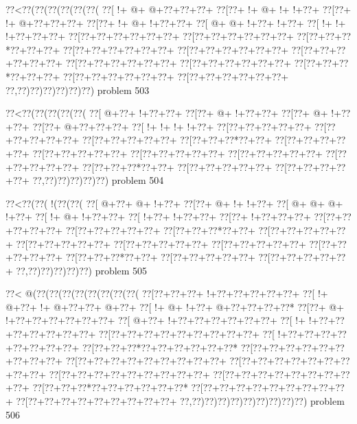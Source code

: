 \vbox{\vbox{\goo
\0??<\0??(\0??(\0??(\0??(\0??(\0??(
\0??[\- !+\- @+\- @+\0??+\0??+\0??+
\0??[\0??+\- !+\- @+\- !+\- !+\0??+
\0??[\0??+\- !+\- @+\0??+\0??+\0??+
\0??[\0??+\- !+\- @+\- !+\0??+\0??+
\0??[\- @+\- @+\- !+\0??+\- !+\0??+
\0??[\- !+\- !+\- !+\0??+\0??+\0??+
\0??[\0??+\0??+\0??+\0??+\0??+\0??+
\0??[\0??+\0??+\0??+\0??+\0??+\0??+
\0??[\0??+\0??+\0??*\0??+\0??+\0??+
\0??[\0??+\0??+\0??+\0??+\0??+\0??+
\0??[\0??+\0??+\0??+\0??+\0??+\0??+
\0??[\0??+\0??+\0??+\0??+\0??+\0??+
\0??[\0??+\0??+\0??+\0??+\0??+\0??+
\0??[\0??+\0??+\0??+\0??+\0??+\0??+
\0??[\0??+\0??+\0??*\0??+\0??+\0??+
\0??[\0??+\0??+\0??+\0??+\0??+\0??+
\0??[\0??+\0??+\0??+\0??+\0??+\0??+
\0??,\0??)\0??)\0??)\0??)\0??)\0??)
}
\hfil problem 503\hfil\break
}

\vbox{\vbox{\goo
\0??<\0??(\0??(\0??(\0??(\0??(
\0??[\- @+\0??+\- !+\0??+\0??+
\0??[\0??+\- @+\- !+\0??+\0??+
\0??[\0??+\- @+\- !+\0??+\0??+
\0??[\0??+\- @+\0??+\0??+\0??+
\0??[\- !+\- !+\- !+\- !+\0??+
\0??[\0??+\0??+\0??+\0??+\0??+
\0??[\0??+\0??+\0??+\0??+\0??+
\0??[\0??+\0??+\0??+\0??+\0??+
\0??[\0??+\0??+\0??*\0??+\0??+
\0??[\0??+\0??+\0??+\0??+\0??+
\0??[\0??+\0??+\0??+\0??+\0??+
\0??[\0??+\0??+\0??+\0??+\0??+
\0??[\0??+\0??+\0??+\0??+\0??+
\0??[\0??+\0??+\0??+\0??+\0??+
\0??[\0??+\0??+\0??*\0??+\0??+
\0??[\0??+\0??+\0??+\0??+\0??+
\0??[\0??+\0??+\0??+\0??+\0??+
\0??,\0??)\0??)\0??)\0??)\0??)
}
\hfil problem 504\hfil\break
}

\vbox{\vbox{\goo
\0??<\0??(\0??(\- !(\0??(\0??(
\0??[\- @+\0??+\- @+\- !+\0??+
\0??[\0??+\- @+\- !+\- !+\0??+
\0??[\- @+\- @+\- @+\- !+\0??+
\0??[\- !+\- @+\- !+\0??+\0??+
\0??[\- !+\0??+\- !+\0??+\0??+
\0??[\0??+\- !+\0??+\0??+\0??+
\0??[\0??+\0??+\0??+\0??+\0??+
\0??[\0??+\0??+\0??+\0??+\0??+
\0??[\0??+\0??+\0??*\0??+\0??+
\0??[\0??+\0??+\0??+\0??+\0??+
\0??[\0??+\0??+\0??+\0??+\0??+
\0??[\0??+\0??+\0??+\0??+\0??+
\0??[\0??+\0??+\0??+\0??+\0??+
\0??[\0??+\0??+\0??+\0??+\0??+
\0??[\0??+\0??+\0??*\0??+\0??+
\0??[\0??+\0??+\0??+\0??+\0??+
\0??[\0??+\0??+\0??+\0??+\0??+
\0??,\0??)\0??)\0??)\0??)\0??)
}
\hfil problem 505\hfil\break
}

\vbox{\vbox{\goo
\0??<\- @(\0??(\0??(\0??(\0??(\0??(\0??(\0??(\0??(
\0??[\0??+\0??+\0??+\- !+\0??+\0??+\0??+\0??+\0??+
\0??[\- !+\- @+\0??+\- !+\- @+\0??+\0??+\- @+\0??+
\0??[\- !+\- @+\- !+\0??+\- @+\0??+\0??+\0??+\0??*
\0??[\0??+\- @+\- !+\0??+\0??+\0??+\0??+\0??+\0??+
\0??[\- @+\0??+\- !+\0??+\0??+\0??+\0??+\0??+\0??+
\0??[\- !+\- !+\0??+\0??+\0??+\0??+\0??+\0??+\0??+
\0??[\0??+\0??+\0??+\0??+\0??+\0??+\0??+\0??+\0??+
\0??[\- !+\0??+\0??+\0??+\0??+\0??+\0??+\0??+\0??+
\0??[\0??+\0??+\0??*\0??+\0??+\0??+\0??+\0??+\0??*
\0??[\0??+\0??+\0??+\0??+\0??+\0??+\0??+\0??+\0??+
\0??[\0??+\0??+\0??+\0??+\0??+\0??+\0??+\0??+\0??+
\0??[\0??+\0??+\0??+\0??+\0??+\0??+\0??+\0??+\0??+
\0??[\0??+\0??+\0??+\0??+\0??+\0??+\0??+\0??+\0??+
\0??[\0??+\0??+\0??+\0??+\0??+\0??+\0??+\0??+\0??+
\0??[\0??+\0??+\0??*\0??+\0??+\0??+\0??+\0??+\0??*
\0??[\0??+\0??+\0??+\0??+\0??+\0??+\0??+\0??+\0??+
\0??[\0??+\0??+\0??+\0??+\0??+\0??+\0??+\0??+\0??+
\0??,\0??)\0??)\0??)\0??)\0??)\0??)\0??)\0??)\0??)
}
\hfil problem 506\hfil\break
}

